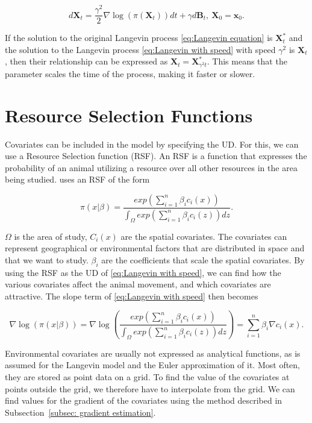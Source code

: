 \begin{equation}
    d\textbf{X}_t = \frac{\gamma^2}{2} \nabla \log(\pi(\textbf{X}_t))dt + \gamma d\textbf{B}_t, \ \textbf{X}_0 = \textbf{x}_0.
    \label{eq:Langevin with speed}
\end{equation}


If the solution to the original Langevin process \eqref{eq:Langevin equation} is $\textbf{X}^*_t$ and the solution to the Langevin process \eqref{eq:Langevin with speed} with speed $\gamma^2$ is $\textbf{X}_t$, then their relationship can be expressed as $\textbf{X}_t = \textbf{X}^*_{\gamma^2 t}$. This means that the parameter scales the time of the process, making it faster or slower.


\section{Resource Selection Functions}

Covariates can be included in the model by specifying the UD. For this, we can use a Resource Selection function (RSF). An RSF is a function that expresses the probability of an animal utilizing a resource over all other resources in the area being studied. \textcite{michelot_langevin_2019} uses an RSF of the form


\begin{equation}
    \pi(x|\beta) = \frac{exp(\sum_{i=1}^n\beta_i c_i(x))}{\int_\Omega exp(\sum_{i=1}^n\beta_i c_i(z))dz}.
    \label{eq: resource selection function}
\end{equation}

$\Omega$ is the area of study, $C_i(x)$ are the spatial covariates. The covariates can represent geographical or environmental factors that are distributed in space and that we want to study. $\beta_i$ are the coefficients that scale the spatial covariates. By using the RSF as the UD of \eqref{eq:Langevin with speed}, we can find how the various covariates affect the animal movement, and which covariates are attractive. The slope term of \eqref{eq:Langevin with speed} then becomes

$$
    \nabla \log(\pi(x|\beta)) = \nabla \log(\frac{exp(\sum_{i=1}^n\beta_i c_i(x))}{\int_\Omega exp(\sum_{i=1}^n\beta_i c_i(z))dz}) =\sum_{i=1}^n \beta_i \nabla c_i(x).
$$



Environmental covariates are usually not expressed as analytical functions, as is assumed for the Langevin model and the Euler approximation of it. Most often, they are stored as point data on a grid. To find the value of the covariates at points outside the grid, we therefore have to interpolate from the grid. We can find values for the gradient of the covariates using the method described in Subsection~\ref{subsec: gradient estimation}.



